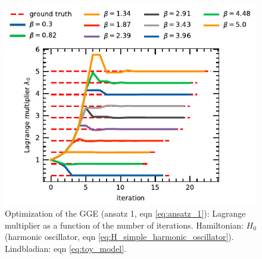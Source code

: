 \begin{figure}[t]
    \centering
    \includegraphics[scale=0.9]{figs/opti_case_1_lagr_0.pdf}
    \caption{Optimization of the GGE (ansatz 1, eqn \ref{eq:ansatz_1}): Lagrange multiplier as a function of the number of iterations. Hamiltonian: $H_0$ (harmonic oscillator, eqn \ref{eq:H_simple_harmonic_oscillator}). Lindbladian: eqn \ref{eq:toy_model}.}
    \label{fig:opti_case_1}
\end{figure}

